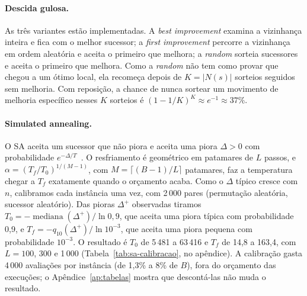 \paragraph{Descida gulosa.}
As três variantes estão implementadas.
A \textit{best improvement} examina a vizinhança inteira e fica com o melhor sucessor; a \textit{first improvement} percorre a vizinhança em ordem aleatória e aceita o primeiro que melhora; a \textit{random} sorteia sucessores e aceita o primeiro que melhora.
Como a \textit{random} não tem como provar que chegou a um ótimo local, ela recomeça depois de $K = |N(s)|$ sorteios seguidos sem melhoria.
Com reposição, a chance de nunca sortear um movimento de melhoria específico nesses $K$ sorteios é $(1 - 1/K)^K \approx e^{-1} \approx 37\%$.

\paragraph{Simulated annealing.}
O SA aceita um sucessor que não piora e aceita uma piora $\Delta > 0$ com probabilidade $e^{-\Delta/T}$~\citep{kirkpatrick1983annealing,slides2026cap4}.
O resfriamento é geométrico em patamares de $L$ passos, e $\alpha = (T_f/T_0)^{1/(M-1)}$, com $M = \lceil (B-1)/L \rceil$ patamares, faz a temperatura chegar a $T_f$ exatamente quando o orçamento acaba.
Como o $\Delta$ típico cresce com $n$, calibramos cada instância uma vez, com 2\,000 pares (permutação aleatória, sucessor aleatório).
Das pioras $\Delta^+$ observadas tiramos $T_0 = -\operatorname{mediana}(\Delta^+)/\ln 0{,}9$, que aceita uma piora típica com probabilidade 0,9, e $T_f = -q_{10}(\Delta^+)/\ln 10^{-3}$, que aceita uma piora pequena com probabilidade $10^{-3}$.
O resultado é $T_0$ de 5\,481 a 63\,416 e $T_f$ de 14,8 a 163,4, com $L = 100$, 300 e 1\,000 (Tabela~\ref{tab:sa-calibracao}, no apêndice).
A calibração gasta 4\,000 avaliações por instância (de 1,3\% a 8\% de $B$), fora do orçamento das execuções; o Apêndice~\ref{ap:tabelas} mostra que descontá-las não muda o resultado.

